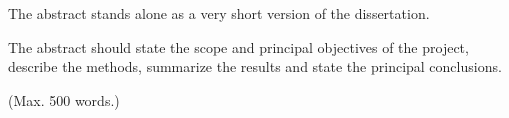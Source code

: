 \begin{singlespace}

    The abstract stands alone as a very short version of the dissertation.
    
    The abstract should state the scope and principal objectives of the project, describe the methods, summarize the results and state the principal conclusions.

    (Max. 500 words.)
\end{singlespace}